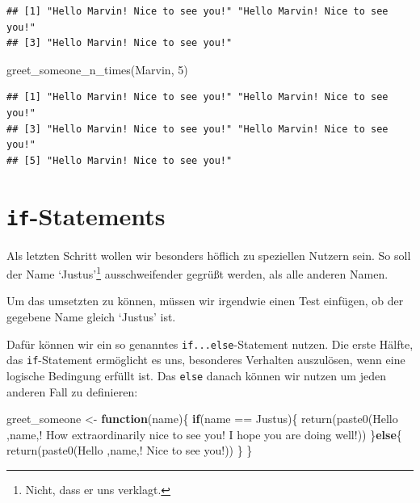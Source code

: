 \documentclass[
]{book}
\newenvironment{Shaded}{\begin{snugshade}}{\end{snugshade}}
\newcommand{\ControlFlowTok}[1]{\textcolor[rgb]{0.13,0.29,0.53}{\textbf{#1}}}
\newcommand{\DecValTok}[1]{\textcolor[rgb]{0.00,0.00,0.81}{#1}}
\newcommand{\FunctionTok}[1]{\textcolor[rgb]{0.00,0.00,0.00}{#1}}
\newcommand{\NormalTok}[1]{#1}
\newcommand{\OtherTok}[1]{\textcolor[rgb]{0.56,0.35,0.01}{#1}}
\newcommand{\SpecialCharTok}[1]{\textcolor[rgb]{0.00,0.00,0.00}{#1}}
\newcommand{\StringTok}[1]{\textcolor[rgb]{0.31,0.60,0.02}{#1}}
\begin{document}
\begin{verbatim}
## [1] "Hello Marvin! Nice to see you!" "Hello Marvin! Nice to see you!"
## [3] "Hello Marvin! Nice to see you!"
\end{verbatim}

\begin{Shaded}
\begin{Highlighting}[]
\FunctionTok{greet\_someone\_n\_times}\NormalTok{(}\StringTok{\textquotesingle{}Marvin\textquotesingle{}}\NormalTok{, }\DecValTok{5}\NormalTok{)}
\end{Highlighting}
\end{Shaded}

\begin{verbatim}
## [1] "Hello Marvin! Nice to see you!" "Hello Marvin! Nice to see you!"
## [3] "Hello Marvin! Nice to see you!" "Hello Marvin! Nice to see you!"
## [5] "Hello Marvin! Nice to see you!"
\end{verbatim}

\hypertarget{if-statements}{%
\chapter{\texorpdfstring{\texttt{if}-Statements}{if-Statements}}\label{if-statements}}

Als letzten Schritt wollen wir besonders höflich zu speziellen Nutzern sein. So soll der Name `Justus'\footnote{Nicht, dass er uns verklagt.} ausschweifender gegrüßt werden, als alle anderen Namen.

Um das umsetzten zu können, müssen wir irgendwie einen Test einfügen, ob der gegebene Name gleich `Justus' ist.

Dafür können wir ein so genanntes \texttt{if...else}-Statement nutzen.
Die erste Hälfte, das \texttt{if}-Statement ermöglicht es uns, besonderes Verhalten auszulösen, wenn eine logische Bedingung erfüllt ist. Das \texttt{else} danach können wir nutzen um jeden anderen Fall zu definieren:

\begin{Shaded}
\begin{Highlighting}[]
\NormalTok{greet\_someone }\OtherTok{\textless{}{-}} \ControlFlowTok{function}\NormalTok{(name)\{}
  \ControlFlowTok{if}\NormalTok{(name }\SpecialCharTok{==} \StringTok{\textquotesingle{}Justus\textquotesingle{}}\NormalTok{)\{}
    \FunctionTok{return}\NormalTok{(}\FunctionTok{paste0}\NormalTok{(}\StringTok{\textquotesingle{}Hello \textquotesingle{}}\NormalTok{,name,}\StringTok{\textquotesingle{}! How extraordinarily nice to see you! I hope you are doing well!\textquotesingle{}}\NormalTok{))}
\NormalTok{  \}}\ControlFlowTok{else}\NormalTok{\{}
    \FunctionTok{return}\NormalTok{(}\FunctionTok{paste0}\NormalTok{(}\StringTok{\textquotesingle{}Hello \textquotesingle{}}\NormalTok{,name,}\StringTok{\textquotesingle{}! Nice to see you!\textquotesingle{}}\NormalTok{))}
\NormalTok{  \}}
\NormalTok{\}}
\end{Highlighting}
\end{Shaded}
\end{document}
